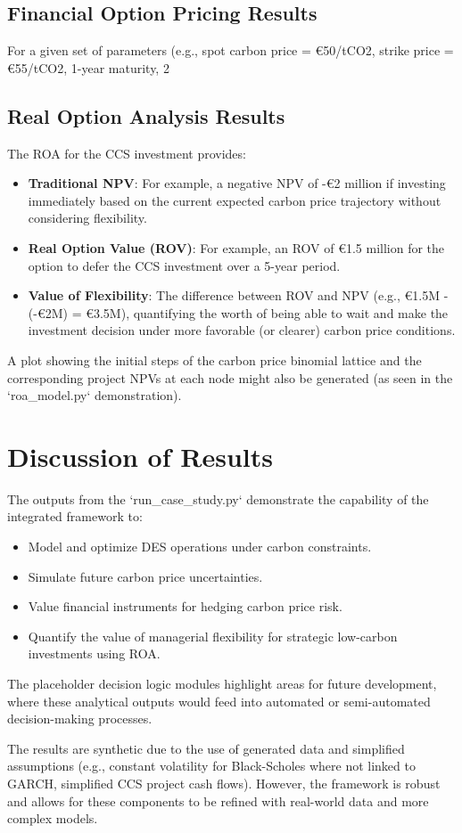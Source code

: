 \subsection{Financial Option Pricing Results}
For a given set of parameters (e.g., spot carbon price = €50/tCO2, strike price = €55/tCO2, 1-year maturity, 2%

\subsection{Real Option Analysis Results}
The ROA for the CCS investment provides:
\begin{itemize}
    \item \textbf{Traditional NPV}: For example, a negative NPV of -€2 million if investing immediately based on the current expected carbon price trajectory without considering flexibility.
    \item \textbf{Real Option Value (ROV)}: For example, an ROV of €1.5 million for the option to defer the CCS investment over a 5-year period. 
    \item \textbf{Value of Flexibility}: The difference between ROV and NPV (e.g., €1.5M - (-€2M) = €3.5M), quantifying the worth of being able to wait and make the investment decision under more favorable (or clearer) carbon price conditions.
\end{itemize}
A plot showing the initial steps of the carbon price binomial lattice and the corresponding project NPVs at each node might also be generated (as seen in the `roa_model.py` demonstration).

\section{Discussion of Results}
The outputs from the `run_case_study.py` demonstrate the capability of the integrated framework to:
\begin{itemize}
    \item Model and optimize DES operations under carbon constraints.
    \item Simulate future carbon price uncertainties.
    \item Value financial instruments for hedging carbon price risk.
    \item Quantify the value of managerial flexibility for strategic low-carbon investments using ROA.
\end{itemize}
The placeholder decision logic modules highlight areas for future development, where these analytical outputs would feed into automated or semi-automated decision-making processes.

The results are synthetic due to the use of generated data and simplified assumptions (e.g., constant volatility for Black-Scholes where not linked to GARCH, simplified CCS project cash flows). However, the framework is robust and allows for these components to be refined with real-world data and more complex models.

